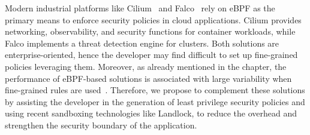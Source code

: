 Modern industrial platforms like Cilium~\cite{cilium} and
Falco~\cite{falco} rely on eBPF as the primary means to enforce
security policies in cloud applications. Cilium provides networking,
observability, and security functions for container workloads, while
Falco implements a threat detection engine for clusters. Both
solutions are enterprise-oriented, hence the developer may find
difficult to set up fine-grained policies leveraging them. Moreover,
as already mentioned in the chapter, the performance of eBPF-based
solutions is associated with large variability when fine-grained rules
are used~\cite{falco-overhead}. Therefore, we propose to complement
these solutions by assisting the developer in the generation of least
privilege security policies and using recent sandboxing technologies
like Landlock, to reduce the overhead and strengthen the security
boundary of the application.

